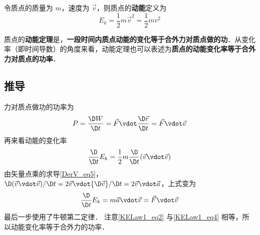 
令质点的质量为 $m$，速度为 $\vec v$，则质点的\textbf{动能}定义为
\begin{equation}
E_k = \frac 12 m\vec v^2 = \frac 12 mv^2
\end{equation}

质点的\textbf{动能定理}是，\textbf{一段时间内质点动能的变化等于合外力对质点做的功}．从变化率（即时间导数）的角度来看，动能定理也可以表述为\textbf{质点的动能变化率等于合外力对质点的功率}．

\subsection{推导}
力对质点做功的功率为
\begin{equation}\label{KELaw1_eq2}
P = \frac{\D W}{\D t} =  \vec F\vdot\frac{\D\vec r}{\D t} = \vec F\vdot\vec v
\end{equation}
再来看动能的变化率
\begin{equation}
\frac{\D}{\D t} E_k = \frac 12 m\frac{\D}{\D t} (\vec v\vdot\vec v)
\end{equation}
由矢量点乘的求导\autoref{DerV_eq5}，${\D}(\vec v\vdot\vec v)/{\D t} = 2\vec v\vdot{\D\vec v}/{\D t} = 2\vec v\vdot\vec a$，上式变为
\begin{equation}\label{KELaw1_eq4}
\frac{\D}{\D t} E_k = m\vec a\vdot\vec v = \vec F\vdot\vec v
\end{equation}
最后一步使用了牛顿第二定律．%
注意\autoref{KELaw1_eq2} 与\autoref{KELaw1_eq4} 相等，所以动能变化率等于合外力的功率．